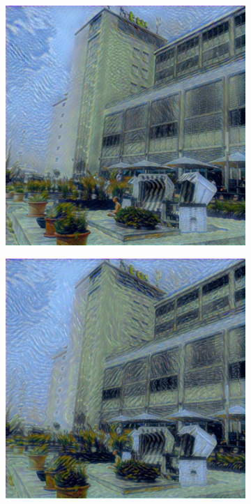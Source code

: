 \begin{figure}[H]
\begin{subfigure}[h]{0.15\textwidth}
    \end{subfigure}
    \begin{subfigure}[h]{0.15\textwidth}
        \centering
        \includegraphics[width=\textwidth]{resources/content/experiments/a__starry_night__768x768__style-weight_1e+07__tv-weight_0e+00.jpg}
    \end{subfigure}
    \begin{subfigure}[h]{0.15\textwidth}
        \centering
        \includegraphics[width=\textwidth]{resources/content/experiments/a__starry_night__768x768__style-weight_1e+08__tv-weight_0e+00.jpg}

\end{subfigure}
\end{figure}
